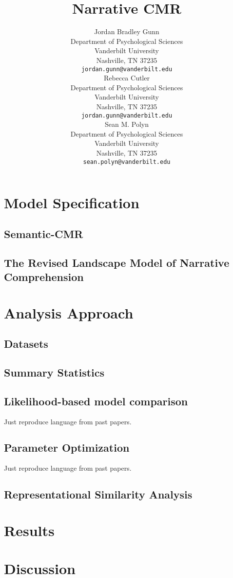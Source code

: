 \documentclass{article}
\title{Narrative CMR}
\author{
  Jordan Bradley Gunn \\
  Department of Psychological Sciences \\
  Vanderbilt University \\
  Nashville, TN 37235 \\
  \texttt{jordan.gunn@vanderbilt.edu} \\
  \AND
  Rebecca Cutler \\
  Department of Psychological Sciences \\
  Vanderbilt University \\
  Nashville, TN 37235 \\
  \texttt{jordan.gunn@vanderbilt.edu} \\
  \AND
  Sean M. Polyn \\
  Department of Psychological Sciences\\
  Vanderbilt University\\
  Nashville, TN 37235 \\
  \texttt{sean.polyn@vanderbilt.edu} \\
}
\begin{document}
\maketitle

\begin{abstract}

\end{abstract}




\section{Model Specification}


\subsection{Semantic-CMR}


\subsection{The Revised Landscape Model of Narrative Comprehension}


\section{Analysis Approach}

\subsection{Datasets}


\subsection{Summary Statistics}

\subsection{Likelihood-based model comparison}
Just reproduce language from past papers.

\subsection{Parameter Optimization}
Just reproduce language from past papers.

\subsection{Representational Similarity Analysis}


\section{Results}


\section{Discussion}




\end{document}
